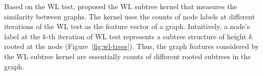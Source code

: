 Based on the WL test, \citet{shervashidze2011weisfeiler} proposed the WL subtree kernel that measures the similarity between graphs. The kernel uses the counts of node labels at different iterations of the WL test as the feature vector of a graph. Intuitively, a node's label at the $k$-th iteration of WL test represents a subtree structure of height $k$ rooted at the node (Figure~\ref{fig:wl-trees}). Thus, the graph features considered by the WL subtree kernel are essentially counts of different rooted subtrees in the graph.
